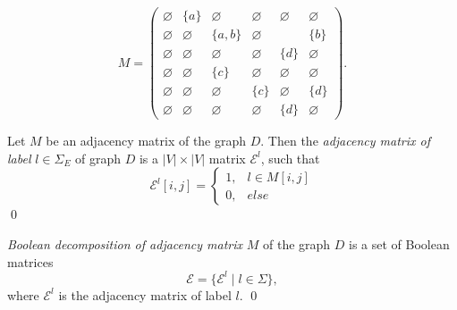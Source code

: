 $$
    M =
    \begin{pmatrix}
    \varnothing     & \{a\} &   \varnothing      &   \varnothing   &   \varnothing   &   \varnothing   \\
    \varnothing     &   \varnothing   & \{a, b\} &   \varnothing   &       & \{b\} \\
    \varnothing     &   \varnothing   &   \varnothing      &   \varnothing   & \{d\} &   \varnothing   \\
    \varnothing     &   \varnothing   & \{c\}    &   \varnothing   &   \varnothing   &   \varnothing   \\
    \varnothing     &   \varnothing   &   \varnothing      & \{c\} &   \varnothing   & \{d\} \\
    \varnothing     & \varnothing     &   \varnothing      &   \varnothing   & \{d\} &   \varnothing
    \end{pmatrix}.
$$

\begin{definition}
Let $M$ be an adjacency matrix of the graph $D$. Then the \emph{adjacency matrix of label} $l \in \Sigma_E$ of graph $D$ is a $|V| \times |V|$ matrix $\mathcal{E}^l$, such that
\begin{equation*}
\mathcal{E}^l[i,j] =
 \begin{cases}
   1, & l \in M[i,j]\\
   0, & else
 \end{cases}
\end{equation*} \qed
\end{definition}

\begin{definition}
\emph{Boolean decomposition of adjacency matrix} $M$ of the graph $D$ is a set of Boolean matrices $$\mathcal{E} = \{\mathcal{E}^l \mid l \in \Sigma\},$$
where $\mathcal{E}^l$ is the adjacency matrix of label $l$. \qed
\end{definition}

